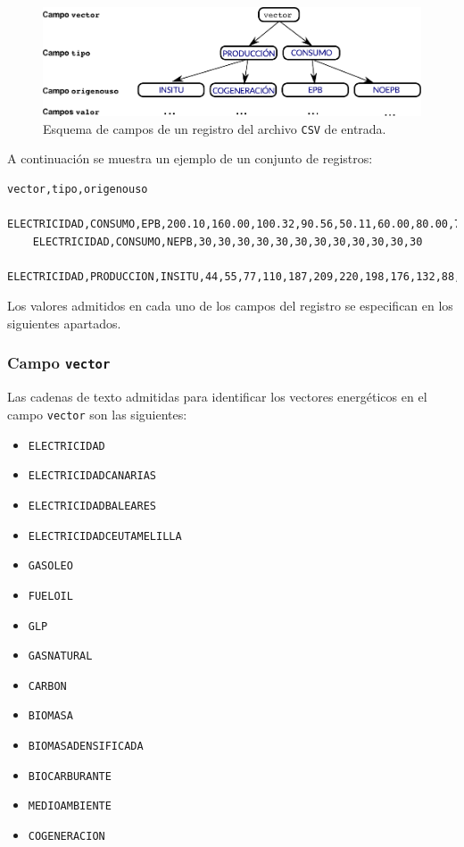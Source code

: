 \documentclass[10pt,notitlepage,oneside,a4paper]{article}
\begin{document}
\begin{figure}[H]
\centering
\includegraphics[width=15cm]{esquemavectores}
\caption{Esquema de campos de un registro del archivo \texttt{CSV} de entrada.}
\label{fig:estructuraVectores}
\end{figure}

A continuación se muestra un ejemplo de un conjunto de registros:

\begin{Verbatim}[frame=single]
    vector,tipo,origenouso
    ELECTRICIDAD,CONSUMO,EPB,200.10,160.00,100.32,90.56,50.11,60.00,80.00,70,50,80,120,160
    ELECTRICIDAD,CONSUMO,NEPB,30,30,30,30,30,30,30,30,30,30,30,30
    ELECTRICIDAD,PRODUCCION,INSITU,44,55,77,110,187,209,220,198,176,132,88,55
\end{Verbatim}

Los valores admitidos en cada uno de los campos del registro se especifican en los siguientes apartados.

\subsubsection{Campo \texttt{vector}}

Las cadenas de texto admitidas para identificar los vectores energéticos en el campo \texttt{vector} son las siguientes:

\begin{itemize}
\item \texttt{ELECTRICIDAD}
\item \texttt{ELECTRICIDADCANARIAS}
\item \texttt{ELECTRICIDADBALEARES}
\item \texttt{ELECTRICIDADCEUTAMELILLA}
\item \texttt{GASOLEO}
\item \texttt{FUELOIL}
\item \texttt{GLP}
\item \texttt{GASNATURAL}
\item \texttt{CARBON}
\item \texttt{BIOMASA}
\item \texttt{BIOMASADENSIFICADA}
\item \texttt{BIOCARBURANTE}
\item \texttt{MEDIOAMBIENTE}
\item \texttt{COGENERACION}
\end{itemize}
\end{document}

